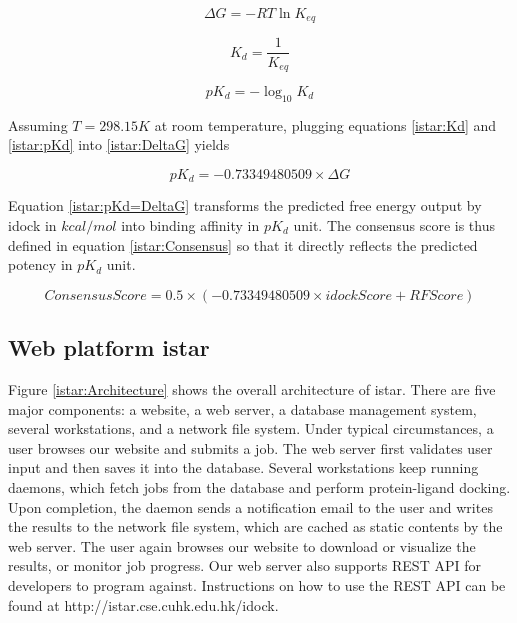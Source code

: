 \begin{equation}
\label{istar:DeltaG}
\Delta G = -RT\ln K_{eq}
\end{equation}

\begin{equation}
\label{istar:Kd}
K_d = \frac{1}{K_{eq}}
\end{equation}

\begin{equation}
\label{istar:pKd}
pK_d = -\log_{10} K_d
\end{equation}

Assuming $T = 298.15K$ at room temperature, plugging equations \eqref{istar:Kd} and \eqref{istar:pKd} into \eqref{istar:DeltaG} yields

\begin{equation}
\label{istar:pKd=DeltaG}
pK_d = -0.73349480509 \times \Delta G
\end{equation}

Equation \eqref{istar:pKd=DeltaG} transforms the predicted free energy output by idock in $kcal/mol$ into binding affinity in $pK_d$ unit. The consensus score is thus defined in equation \eqref{istar:Consensus} so that it directly reflects the predicted potency in $pK_d$ unit.

\begin{equation}
\label{istar:Consensus}
ConsensusScore = 0.5 \times (-0.73349480509 \times idockScore + RFScore)
\end{equation}

\subsection{Web platform istar}

Figure \ref{istar:Architecture} shows the overall architecture of istar. There are five major components: a website, a web server, a database management system, several workstations, and a network file system. Under typical circumstances, a user browses our website and submits a job. The web server first validates user input and then saves it into the database. Several workstations keep running daemons, which fetch jobs from the database and perform protein-ligand docking. Upon completion, the daemon sends a notification email to the user and writes the results to the network file system, which are cached as static contents by the web server. The user again browses our website to download or visualize the results, or monitor job progress. Our web server also supports REST API for developers to program against. Instructions on how to use the REST API can be found at http://istar.cse.cuhk.edu.hk/idock.

